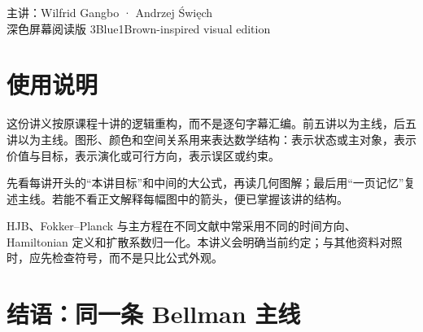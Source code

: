 \documentclass[11pt,oneside,openany,fontset=none]{ctexbook}
\begin{document}
\begin{titlepage}
\vfill
\begin{flushleft}
{\sffamily\small\textcolor{MutedText}{主讲：Wilfrid Gangbo · Andrzej Święch}}\\[2mm]
{\sffamily\small\textcolor{BlueAccent}{深色屏幕阅读版 \quad 3Blue1Brown-inspired visual edition}}
\end{flushleft}
\end{titlepage}

\frontmatter
\chapter*{使用说明}

这份讲义按原课程十讲的逻辑重构，而不是逐句字幕汇编。前五讲以为主线，后五讲以为主线。图形、颜色和空间关系用来表达数学结构：表示状态或主对象，表示价值与目标，表示演化或可行方向，表示误区或约束。

\begin{intuition}[怎样使用这份讲义]
先看每讲开头的“本讲目标”和中间的大公式，再读几何图解；最后用“一页记忆”复述主线。若能不看正文解释每幅图中的箭头，便已掌握该讲的结构。
\end{intuition}

\begin{pitfall}[约定说明]
HJB、Fokker--Planck 与主方程在不同文献中常采用不同的时间方向、Hamiltonian 定义和扩散系数归一化。本讲义会明确当前约定；与其他资料对照时，应先检查符号，而不是只比公式外观。
\end{pitfall}

\tableofcontents

\mainmatter












\appendix


\backmatter
\chapter*{结语：同一条 Bellman 主线}
\end{document}
